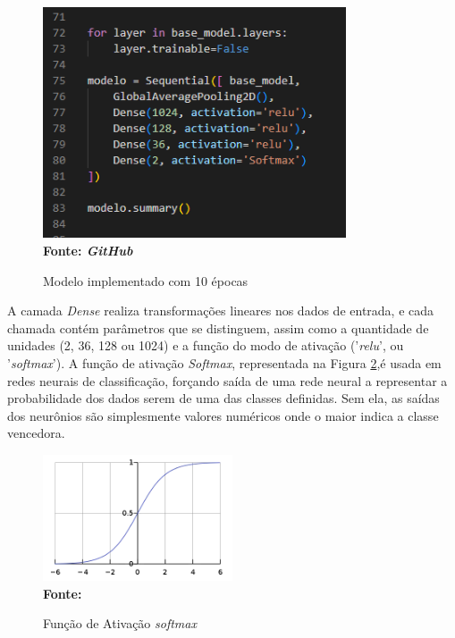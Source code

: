 \begin{figure}[ht]
 	\centering	
 	\caption[\hspace{0.1cm}Grade Computacional.]{Modelo implementado com 10 épocas}
 	\vspace{-0.4cm}
 	\includegraphics[width=0.8\textwidth]{figuras/model.png}
 	\captionsetup{justification=centering}
	\vspace{-0.2cm}
     \\\textbf{\footnotesize Fonte: \textit{GitHub}}
	\label{fig:model}
\end{figure}

A camada \textit{Dense} realiza transformações lineares nos dados de entrada, e cada chamada contém parâmetros que se distinguem, assim como a quantidade de unidades (2, 36, 128 ou 1024) e a função do modo de ativação ('\textit{relu}', ou '\textit{softmax}'). A função de ativação \textit{Softmax}, representada na Figura \ref{fig:softmax},é usada em redes neurais de classificação, forçando saída de uma rede neural a representar a probabilidade dos dados serem de uma das classes definidas. Sem ela, as saídas dos neurônios são simplesmente valores numéricos onde o maior indica a classe vencedora.
\begin{figure}[ht]
 	\centering	
 	\caption[\hspace{0.1cm}Grade Computacional.]{Função de Ativação \textit{softmax}}
 	\vspace{-0.4cm}
 	\includegraphics[width=0.5\textwidth]{figuras/softmax.png}
 	\captionsetup{justification=centering}
	\vspace{-0.2cm}
     \\\textbf{\footnotesize Fonte: \cite{softmax}}
	\label{fig:softmax}
\end{figure}

